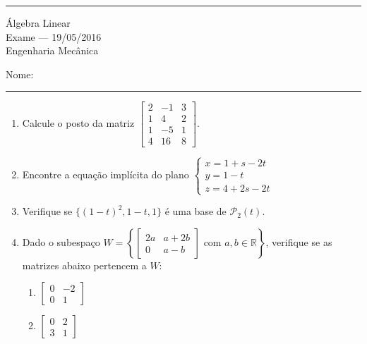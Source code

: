 \documentclass{article}
\begin{document}
\noindent{}\rule{\textwidth}{0.4pt}
\begin{center}
	\'{A}lgebra Linear\\
	Exame --- 19/05/2016 \\
	Engenharia Mec\^anica \\
	\vspace{0.2cm}
\end{center}
Nome: \\
\noindent{}\rule{\textwidth}{0.4pt}

\begin{enumerate}
\item Calcule o posto da matriz 
$\left[\begin{array}{ccc}
	2 & -1 & 3 \\
	1 & 4 & 2 \\
	1 & -5 & 1 \\
	4 & 16 & 8
\end{array}\right]$.

\item Encontre a equa\c{c}\~ao impl\'icita do plano
$\left\{\begin{array}{l}
	x = 1+s-2t \\
	y = 1-t \\
	z = 4+2s-2t
\end{array}\right.$

\item Verifique se $\{(1-t)^2, 1-t, 1\}$ \'e uma base de $\mathcal{P}_2(t)$.

\item Dado o subespa\c{c}o
	$W = \left\{
		\left[\begin{array}{cc}
			2a & a+2b \\
			0 & a-b
		\end{array}\right] \mbox{ com }
	a, b \in \mathbb{R}\right\}$,
	verifique se as matrizes abaixo pertencem a $W$:
	\begin{enumerate}
		\item
			$\left[\begin{array}{cc}
				0 & -2 \\
				0 & 1
			\end{array}\right]$
		\item
			$\left[\begin{array}{cc}
				0 & 2 \\
				3 & 1
			\end{array}\right]$
	\end{enumerate}


\end{enumerate}
\end{document}
